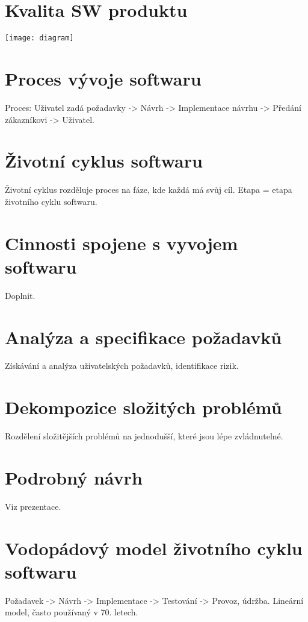 \documentclass{article}
\begin{document}
\section{Kvalita SW produktu}
\texttt{[image: diagram]} %

\section{Proces vývoje softwaru}
Proces:
Uživatel zadá požadavky -> Návrh -> Implementace návrhu -> Předání zákazníkovi -> Uživatel.

\section{Životní cyklus softwaru}
Životní cyklus rozděluje proces na fáze, kde každá má svůj cíl. Etapa = etapa životního cyklu softwaru.

\section{Cinnosti spojene s vyvojem softwaru}
Doplnit.

\section{Analýza a specifikace požadavků}
Získávání a analýza uživatelských požadavků, identifikace rizik.

\section{Dekompozice složitých problémů}
Rozdělení složitějších problémů na jednodušší, které jsou lépe zvládnutelné.

\section{Podrobný návrh}
Viz prezentace.

\section{Vodopádový model životního cyklu softwaru}
Požadavek -> Návrh -> Implementace -> Testování -> Provoz, údržba.
Lineární model, často používaný v 70. letech.
\end{document}

